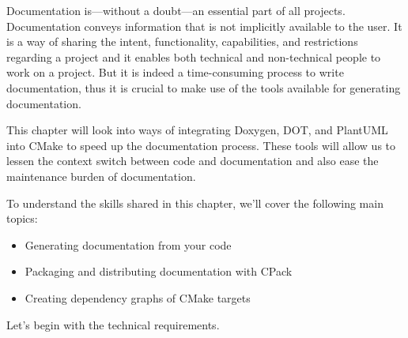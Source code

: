 Documentation is—without a doubt—an essential part of all projects. Documentation conveys information that is not implicitly available to the user. It is a way of sharing the intent, functionality, capabilities, and restrictions regarding a project and it enables both technical and non-technical people to work on a project. But it is indeed a time-consuming process to write documentation, thus it is crucial to make use of the tools available for generating documentation.

This chapter will look into ways of integrating Doxygen, DOT, and PlantUML into CMake to speed up the documentation process. These tools will allow us to lessen the context switch between code and documentation and also ease the maintenance burden of documentation.

To understand the skills shared in this chapter, we'll cover the following main topics:

\begin{itemize}
\item 
Generating documentation from your code

\item 
Packaging and distributing documentation with CPack

\item 
Creating dependency graphs of CMake targets
\end{itemize}

Let's begin with the technical requirements.







